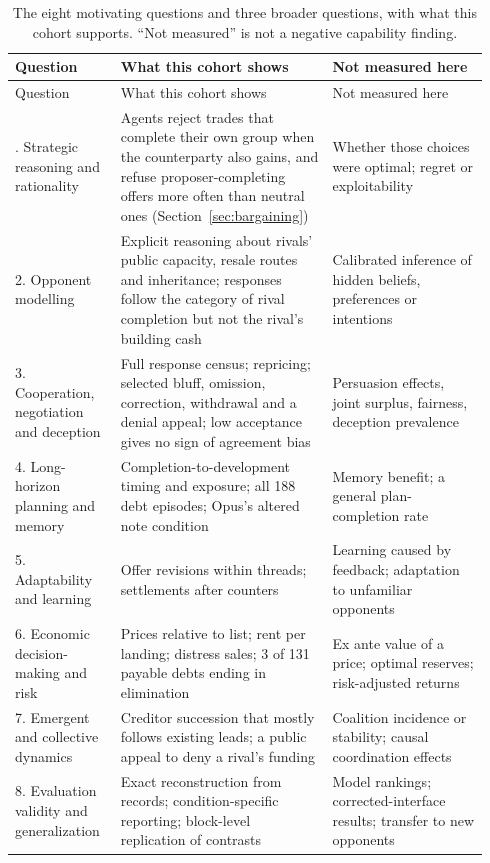 \begingroup\footnotesize
\renewcommand{\arraystretch}{1.12}
\begin{longtable}{@{}L{0.21\linewidth}L{0.42\linewidth}L{0.31\linewidth}@{}}
\caption{The eight motivating questions and three broader questions, with what this cohort supports. ``Not measured'' is not a negative capability finding.}\label{tab:questions}\\
\toprule
Question & What this cohort shows & Not measured here\\
\midrule\endfirsthead
\toprule
Question & What this cohort shows & Not measured here\\
\midrule\endhead
\bottomrule{}. Strategic reasoning and rationality & Agents reject trades that complete their own group when the counterparty also gains, and refuse proposer-completing offers more often than neutral ones (Section~\ref{sec:bargaining}) & Whether those choices were optimal; regret or exploitability\\
2. Opponent modelling & Explicit reasoning about rivals' public capacity, resale routes and inheritance; responses follow the category of rival completion but not the rival's building cash & Calibrated inference of hidden beliefs, preferences or intentions\\
3. Cooperation, negotiation and deception & Full response census; repricing; selected bluff, omission, correction, withdrawal and a denial appeal; low acceptance gives no sign of agreement bias & Persuasion effects, joint surplus, fairness, deception prevalence\\
4. Long-horizon planning and memory & Completion-to-development timing and exposure; all 188 debt episodes; Opus's altered note condition & Memory benefit; a general plan-completion rate\\
5. Adaptability and learning & Offer revisions within threads; settlements after counters & Learning caused by feedback; adaptation to unfamiliar opponents\\
6. Economic decision-making and risk & Prices relative to list; rent per landing; distress sales; 3 of 131 payable debts ending in elimination & Ex ante value of a price; optimal reserves; risk-adjusted returns\\
7. Emergent and collective dynamics & Creditor succession that mostly follows existing leads; a public appeal to deny a rival's funding & Coalition incidence or stability; causal coordination effects\\
8. Evaluation validity and generalization & Exact reconstruction from records; condition-specific reporting; block-level replication of contrasts & Model rankings; corrected-interface results; transfer to new opponents\\

\end{longtable}

